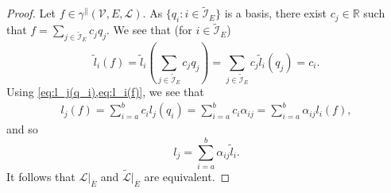 \documentclass[sn-mathphys-num]{sn-jnl}%
\theoremstyle{thmstyleone}%
\newcommand{\closure}[1]{\overline{#1}}
\newcommand{\subentity}{E}
\newcommand{\polyspace}{\mathcal{V}}
\newcommand{\dualbasis}{\mathcal{L}}
\newcommand{\ctrace}[3]{\gamma^\parallel(#1,#2,#3)}
\theoremstyle{thmstyletwo}%
\theoremstyle{thmstylethree}%
\begin{document}
\begin{proof}
Let $f\in\ctrace{\polyspace}{\subentity}{\dualbasis}$. As $\{q_i:i\in\widetilde{\mathcal{I}}_{\subentity}\}$ is a basis, there
exist $c_j\in\mathbb{R}$ such that $f=\sum_{j\in\widetilde{\mathcal{I}}_{\subentity}}c_jq_j$. We see that
(for $i\in\widetilde{\mathcal{I}}_{\subentity}$)
\begin{equation}\label{eq:l_i(f)}
\tilde{l}_i(f)
=
\tilde{l}_i\left(\sum_{j\in\widetilde{\mathcal{I}}_{\subentity}}c_jq_j\right)
=
\sum_{j\in\widetilde{\mathcal{I}}_{\subentity}}c_j\tilde{l}_i\left(q_j\right)
=
c_i.
\end{equation}
Using \cref{eq:l_j(q_i),eq:l_i(f)}, we see that
\begin{align*}
l_j(f)
= \sum_{i=a}^bc_il_j\left(q_i\right)
= \sum_{i=a}^bc_i\alpha_{ij}
= \sum_{i=a}^b\alpha_{ij}l_i(f),
\end{align*}
and so
\[
l_j = \sum_{i=a}^b\alpha_{ij}\tilde{l}_i.
\]
It follows that $\dualbasis|_{\closure{\subentity}}$ and $\tilde{\dualbasis}|_{\closure{\subentity}}$
are equivalent.
\end{proof}
\end{document}
